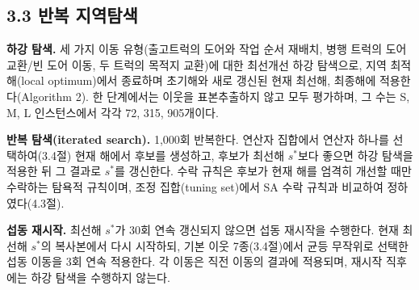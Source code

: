 \documentclass[10pt,a4paper]{article}
\begin{document}
\subsection{3.3 반복 지역탐색}
\textbf{하강 탐색.} 세 가지 이동 유형(출고트럭의 도어와 작업 순서 재배치, 병행 트럭의 도어 교환/빈 도어 이동, 두
트럭의 목적지 교환)에 대한 최선개선 하강 탐색으로, 지역 최적해(local optimum)에서
종료하며 초기해와 새로 갱신된 현재 최선해, 최종해에 적용한다(Algorithm 2).
한 단계에서는 이웃을 표본추출하지 않고 모두 평가하며, 그 수는 S, M, L 인스턴스에서 각각 72, 315, 905개이다.

\textbf{반복 탐색(iterated search).} 1{,}000회 반복한다. 연산자 집합에서 연산자 하나를 선택하여(3.4절)
현재 해에서 후보를 생성하고, 후보가 최선해 $s^*$보다 좋으면 하강 탐색을 적용한 뒤 그 결과로
$s^*$를 갱신한다. 수락 규칙은 후보가 현재 해를 엄격히 개선할 때만 수락하는 탐욕적 규칙이며, 조정 집합(tuning set)에서 SA 수락 규칙과 비교하여 정하였다(4.3절).

\textbf{섭동 재시작.} 최선해 $s^*$가 30회 연속 갱신되지 않으면 섭동 재시작을
수행한다. 현재 최선해 $s^*$의 복사본에서 다시 시작하되, 기본 이웃 7종(3.4절)에서
균등 무작위로 선택한 섭동 이동을 3회 연속 적용한다. 각 이동은 직전 이동의 결과에
적용되며, 재시작 직후에는 하강 탐색을 수행하지 않는다.
\end{document}
